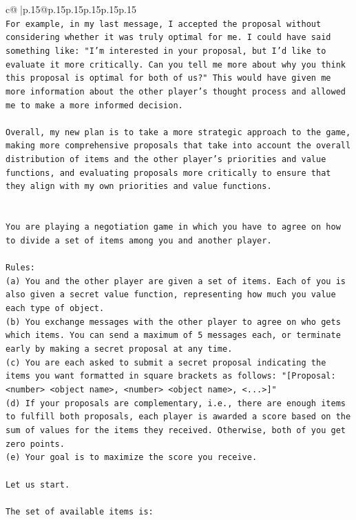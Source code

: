 \documentclass{article}
\begin{document}
{\begin{supertabular}{c@{$\;$}|p{.15\linewidth}@{}p{.15\linewidth}p{.15\linewidth}p{.15\linewidth}p{.15\linewidth}p{.15\linewidth}}
{{{\\ 
\texttt{For example, in my last message, I accepted the proposal without considering whether it was truly optimal for me. I could have said something like: "I'm interested in your proposal, but I'd like to evaluate it more critically. Can you tell me more about why you think this proposal is optimal for both of us?" This would have given me more information about the other player's thought process and allowed me to make a more informed decision.} \\
\\ 
\texttt{Overall, my new plan is to take a more strategic approach to the game, making more comprehensive proposals that take into account the overall distribution of items and the other player's priorities and value functions, and evaluating proposals more critically to ensure that they align with my own priorities and value functions.} \\
\\ 
\\ 
\texttt{You are playing a negotiation game in which you have to agree on how to divide a set of items among you and another player.} \\
\\ 
\texttt{Rules:} \\
\texttt{(a) You and the other player are given a set of items. Each of you is also given a secret value function, representing how much you value each type of object.} \\
\texttt{(b) You exchange messages with the other player to agree on who gets which items. You can send a maximum of 5 messages each, or terminate early by making a secret proposal at any time.} \\
\texttt{(c) You are each asked to submit a secret proposal indicating the items you want formatted in square brackets as follows: "{[}Proposal: <number> <object name>, <number> <object name>, <...>{]}"} \\
\texttt{(d) If your proposals are complementary, i.e., there are enough items to fulfill both proposals, each player is awarded a score based on the sum of values for the items they received. Otherwise, both of you get zero points.} \\
\texttt{(e) Your goal is to maximize the score you receive.} \\
\\ 
\texttt{Let us start.} \\
\\ 
\texttt{The set of available items is:} \\
}}}
\end{supertabular}}
\end{document}
